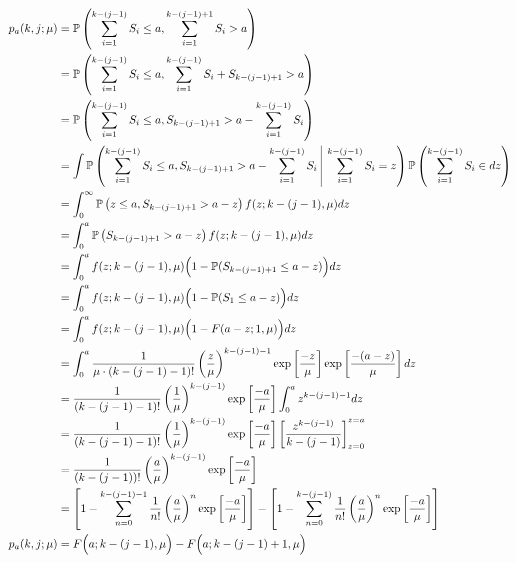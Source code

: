 \documentclass{article}
\begin{document}
\begin{align*}
	p_{a} (k, j; \mu) & = \mathbb{P} \left( \sum_{i = 1}^{k - (j - 1)} S_{i} \leq a, \sum_{i = 1}^{k - (j - 1) + 1} S_{i} > a \right) \\
	& = \mathbb{P} \left( \sum_{i = 1}^{k - (j - 1)} S_{i} \leq a, \sum_{i = 1}^{k - (j - 1)} S_{i} + S_{k - (j - 1) + 1} > a \right) \\
	& = \mathbb{P} \left( \sum_{i = 1}^{k - (j - 1)} S_{i} \leq a, S_{k - (j - 1) + 1} > a - \sum_{i = 1}^{k - (j - 1)} S_{i} \right) \\
	& = \int \mathbb{P} \left( \sum_{i = 1}^{k - (j - 1)} S_{i} \leq a, S_{k - (j - 1) + 1} > a - \sum_{i = 1}^{k - (j - 1)} S_{i} \ \vline \ \sum_{i = 1}^{k - (j - 1)} S_{i} = z \right) \mathbb{P} \left( \sum_{i = 1}^{k - (j - 1)} S_{i} \in d z \right) \\
	& = \int_{0}^{\infty} \mathbb{P} \left( z \leq a, S_{k - (j - 1) + 1} > a - z \right) f (z; k - (j - 1), \mu) d z \\
	& = \int_{0}^{a} \mathbb{P} \left( S_{k - (j - 1) + 1} > a - z \right) f (z; k - (j - 1), \mu) d z \\
	& = \int_{0}^{a} f (z; k - (j - 1), \mu) \Big( 1 - \mathbb{P} (S_{k - ( j - 1) + 1} \leq a - z) \Big) d z \\
	& = \int_{0}^{a} f (z; k - (j - 1), \mu) \Big( 1 - \mathbb{P} (S_{1} \leq a - z) \Big) d z \\
	& = \int_{0}^{a} f (z; k - (j - 1), \mu) \Big( 1 - F (a - z; 1, \mu) \Big) d z \\
	& = \int_{0}^{a} \frac{1}{\mu \cdot (k - (j - 1) - 1)!} \left( \frac{z}{\mu} \right)^{k - (j - 1) - 1} \exp \left[ \frac{-z}{\mu} \right] \exp \left[ \frac{- (a - z)}{\mu} \right] d z \\
	& = \frac{1}{(k - (j - 1) - 1)!} \left( \frac{1}{\mu} \right)^{k - (j - 1)} \exp \left[ \frac{-a}{\mu} \right] \int_{0}^{a} z^{k - (j - 1) - 1} d z \\
	& = \frac{1}{(k - (j - 1) - 1)!} \left( \frac{1}{\mu} \right)^{k - (j - 1)} \exp \left[ \frac{-a}{\mu} \right] \left[ \frac{z^{k - (j - 1)}}{k - (j - 1)} \right]_{z = 0}^{z = a} \\
	& = \frac{1}{(k - (j - 1))!} \left( \frac{a}{\mu} \right)^{k - (j - 1)} \exp \left[ \frac{-a}{\mu} \right] \\
	& = \left[ 1 - \sum_{n = 0}^{k - (j - 1) - 1} \frac{1}{n!} \left( \frac{a}{\mu} \right)^{n} \exp \left[ \frac{-a}{\mu} \right] \right] - \left[ 1 - \sum_{n = 0}^{k - (j - 1)} \frac{1}{n!} \left( \frac{a}{\mu} \right)^{n} \exp \left[ \frac{-a}{\mu} \right] \right] \\
	p_{a} (k, j; \mu) & = F \Big( a; k - (j - 1), \mu \Big) - F \Big( a; k - (j - 1) + 1, \mu \Big) \\
\end{align*}
\end{document}
